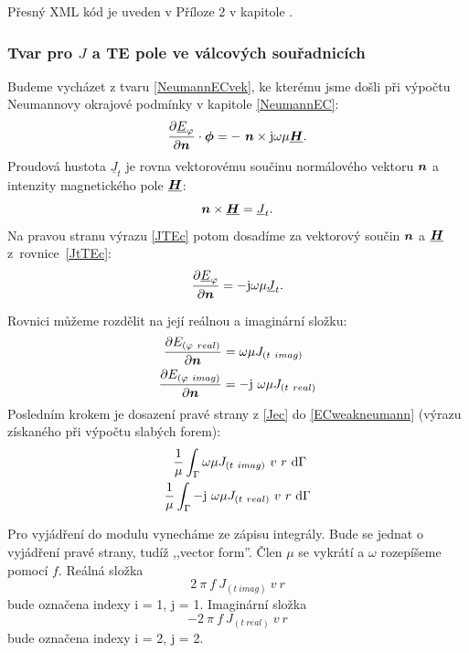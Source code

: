 \documentclass[12pt,a4paper,oneside]{article}
\numberwithin{equation}{section} %
\numberwithin{figure}{section} %
\numberwithin{table}{section} %
\newcommand{\mj}{\mathrm{j}} %
\renewcommand{\vec}[1]{\mbox{\boldmath$#1$}} %
\newcommand{\faz}[1]{{\underline{#1}}} %
\begin{document}
Přesný XML kód je uveden v Příloze 2 v kapitole .


\subsubsection*{Tvar pro \faz{\vec{J}} a TE pole ve válcových souřadnicích}
Budeme vycházet z tvaru \ref{NeumannECvek}, ke kterému jsme došli při výpočtu Neumannovy okrajové podmínky v kapitole \ref{NeumannEC}:
\begin{equation}
\label{JTEc}
\frac{\partial \faz{E}_{\varphi}}{\partial \vec{n}} \cdot \vec{\phi} = - ~ \vec{n} \times \mj \omega \mu \faz{\vec{H}} .
\end{equation}
Proudová hustota $\faz{J} _t$ je rovna vektorovému součinu normálového vektoru $\vec{n}$ a intenzity magnetického pole $\faz{\vec{H}}$:
\begin{equation}
\label{JtTEc}
\vec{n} \times \faz{\vec{H}} = \faz{J} _t .
\end{equation}
Na pravou stranu výrazu \ref{JTEc} potom dosadíme za vektorový součin $\vec{n}$ a $\faz{\vec{H}}$ z~rovnice~\ref{JtTEc}:
\begin{equation}
\frac{\partial \faz{E}_{\varphi}}{\partial \vec{n}} = - \mj \omega \mu \faz{J} _t .
\end{equation}

Rovnici můžeme rozdělit na její reálnou a imaginární složku:
\begin{subequations}
\label{Jec}
\begin{align}
\frac{\partial E _{(\varphi ~real)}}{\partial \vec{n}} &= \omega \mu  J _{(t~imag)}
\\
\frac{\partial E _{(\varphi ~imag)}}{\partial \vec{n}} &= - \mj ~ \omega \mu J _{(t~real)}
\end{align}
\end{subequations}
Posledním krokem je dosazení pravé strany z \ref{Jec} do \ref{ECweakneumann} (výrazu získaného při výpočtu slabých forem):
\begin{subequations}
\begin{align}
\frac{1}{\mu} \int _{\Gamma} \omega \mu J _{(t~imag)} ~ v ~ r ~ \ud \Gamma ~
\\
\frac{1}{\mu} \int _{\Gamma} - \mj ~ \omega \mu J _{(t~real)} ~ v ~ r ~ \ud \Gamma
\end{align}
\end{subequations}

Pro vyjádření do modulu vynecháme ze zápisu integrály. Bude se jednat o vyjádření pravé strany, tudíž ,,vector form''. Člen $\mu$ se vykrátí a $\omega$ rozepíšeme pomocí $f$. Reálná složka  
\begin{equation}
2 ~ \pi ~ f ~ J_{(t~imag)} ~ v ~ r
\end{equation} 
bude označena indexy i = 1, j = 1. Imaginární složka 
\begin{equation}
- 2 ~ \pi ~ f ~ J_{(t~real)} ~ v ~ r
\end{equation}
bude označena indexy i = 2, j = 2.
\end{document}
